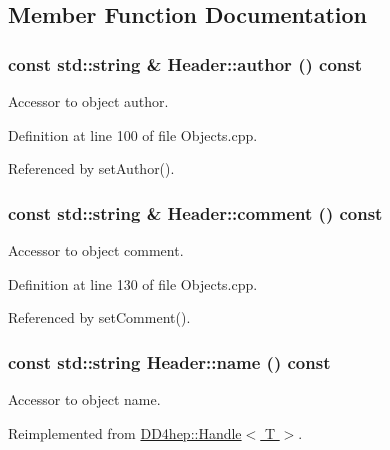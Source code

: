 \subsection{Member Function Documentation}
\hypertarget{class_d_d4hep_1_1_geometry_1_1_header_a6fdee88e5082f7951371f0ae19398f9d}{
\subsubsection[{author}]{\setlength{\rightskip}{0pt plus 5cm}const std::string \& Header::author () const}}
\label{class_d_d4hep_1_1_geometry_1_1_header_a6fdee88e5082f7951371f0ae19398f9d}


Accessor to object author. 

Definition at line 100 of file Objects.cpp.

Referenced by setAuthor().\hypertarget{class_d_d4hep_1_1_geometry_1_1_header_a9b2886fefe76b723d4de953f871438f5}{
\subsubsection[{comment}]{\setlength{\rightskip}{0pt plus 5cm}const std::string \& Header::comment () const}}
\label{class_d_d4hep_1_1_geometry_1_1_header_a9b2886fefe76b723d4de953f871438f5}


Accessor to object comment. 

Definition at line 130 of file Objects.cpp.

Referenced by setComment().\hypertarget{class_d_d4hep_1_1_geometry_1_1_header_a56f8ff7aee494b00bb948dbc2cf55275}{
\subsubsection[{name}]{\setlength{\rightskip}{0pt plus 5cm}const std::string Header::name () const}}
\label{class_d_d4hep_1_1_geometry_1_1_header_a56f8ff7aee494b00bb948dbc2cf55275}


Accessor to object name. 

Reimplemented from \hyperlink{class_d_d4hep_1_1_handle_a9c62b8d37e0f2354bae0093498dc15a1}{DD4hep::Handle$<$ T $>$}.

